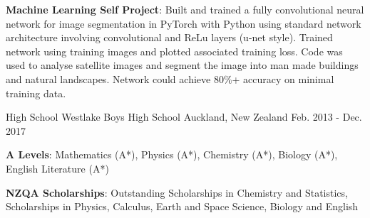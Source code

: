 \begin{cventries}
{\begin{cvitems}
        \item {\textbf{Machine Learning Self Project}: Built and trained a fully convolutional neural network for image segmentation in PyTorch with Python using standard network architecture involving convolutional and ReLu layers (u-net style). Trained network using training images and plotted associated training loss. Code was used to analyse satellite images and segment the image into man made buildings and natural landscapes. Network could achieve 80\%+ accuracy on minimal training data.}
      \end{cvitems}
    }

  \cventry
    {High School} %
    {Westlake Boys High School} %
    {Auckland, New Zealand} %
    {Feb. 2013 - Dec. 2017} %
    {
      \begin{cvitems}
        \item {\textbf{A Levels}: Mathematics (A*), Physics (A*), Chemistry (A*), Biology (A*), English Literature (A*)}
        \item {\textbf{NZQA Scholarships}: Outstanding Scholarships in Chemistry and Statistics, Scholarships in Physics, Calculus, Earth and Space Science, Biology and English}
      \end{cvitems}
    }
\end{cventries}
